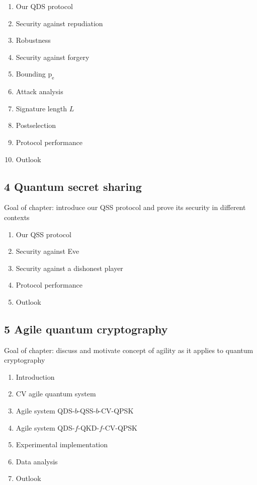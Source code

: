 \documentclass{article}
\begin{document}
\begin{enumerate}
\item Our QDS protocol
\item Security against repudiation
\item Robustness
\item Security against forgery
\item Bounding $\text{p}_{\text{e}}$
\item Attack analysis
\item Signature length $L$
\item Postselection
\item Protocol performance
\item Outlook
\end{enumerate}

\subsection*{4 Quantum secret sharing}
Goal of chapter: introduce our QSS protocol and prove its security in different contexts

\begin{enumerate}
\item Our QSS protocol
\item Security against Eve
\item Security against a dishonest player
\item Protocol performance
\item Outlook
\end{enumerate}


\subsection*{5 Agile quantum cryptography}
Goal of chapter: discuss and motivate concept of agility as it applies to quantum cryptography

\begin{enumerate}
\item Introduction
\item CV agile quantum system
\item Agile system QDS-$b$-QSS-$b$-CV-QPSK
\item Agile system QDS-$f$-QKD-$f$-CV-QPSK
\item Experimental implementation
\item Data analysis
\item Outlook
\end{enumerate}
\end{document}
